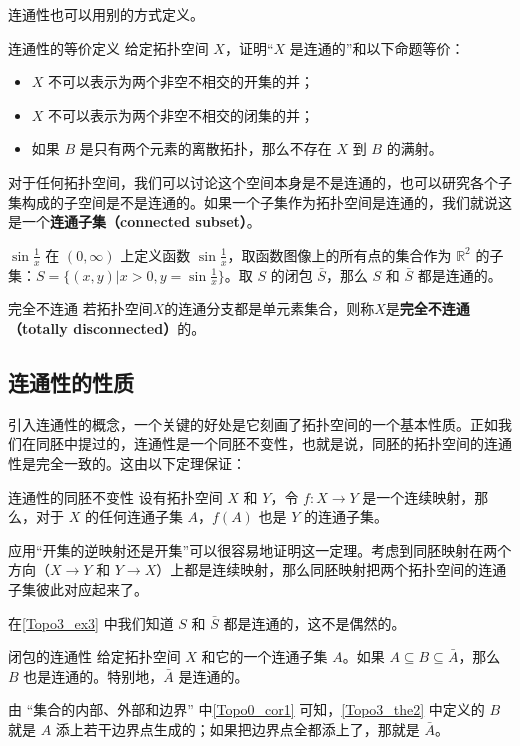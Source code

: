 连通性也可以用别的方式定义。

\begin{exercise}{连通性的等价定义}\label{Topo3_exe1}
给定拓扑空间 $X$，证明“$X$ 是连通的”和以下命题等价：
\begin{itemize}
\item $X$ 不可以表示为两个非空不相交的开集的并；
\item $X$ 不可以表示为两个非空不相交的闭集的并；
\item 如果 $B$ 是只有两个元素的离散拓扑，那么不存在 $X$ 到 $B$ 的满射。

\end{itemize}
\end{exercise}

对于任何拓扑空间，我们可以讨论这个空间本身是不是连通的，也可以研究各个子集构成的子空间是不是连通的。如果一个子集作为拓扑空间是连通的，我们就说这是一个\textbf{连通子集（connected subset）}。

\begin{example}{$\sin{\frac{1}{x}}$}\label{Topo3_ex3}
在 $(0,\infty)$ 上定义函数 $\sin{\frac{1}{x}}$，取函数图像上的所有点的集合作为 $\mathbb{R}^2$ 的子集：$S=\{(x, y)|x>0, y=\sin{\frac{1}{x}}\}$。取 $S$ 的闭包 $\bar{S}$，那么 $S$ 和 $\bar{S}$ 都是连通的。
\end{example}


\begin{definition}{完全不连通}
若拓扑空间$X$的连通分支都是单元素集合，则称$X$是\textbf{完全不连通（totally disconnected）}的。
\end{definition}








\subsection{连通性的性质}

引入连通性的概念，一个关键的好处是它刻画了拓扑空间的一个基本性质。正如我们在同胚中提过的，连通性是一个同胚不变性，也就是说，同胚的拓扑空间的连通性是完全一致的。这由以下定理保证：

\begin{theorem}{连通性的同胚不变性}\label{Topo3_the1}
设有拓扑空间 $X$ 和 $Y$，令 $f:X\rightarrow Y$ 是一个连续映射，那么，对于 $X$ 的任何连通子集 $A$，$f(A)$ 也是 $Y$ 的连通子集。
\end{theorem}

应用“开集的逆映射还是开集”可以很容易地证明这一定理。考虑到同胚映射在两个方向（$X\rightarrow Y$ 和 $Y\rightarrow X$）上都是连续映射，那么同胚映射把两个拓扑空间的连通子集彼此对应起来了。

在\autoref{Topo3_ex3} 中我们知道 $S$ 和 $\bar{S}$ 都是连通的，这不是偶然的。

\begin{theorem}{闭包的连通性}\label{Topo3_the2}
给定拓扑空间 $X$ 和它的一个连通子集 $A$。如果 $A\subseteq B\subseteq\bar{A}$，那么 $B$ 也是连通的。特别地，$\bar{A}$ 是连通的。
\end{theorem}

由 “集合的内部、外部和边界” 中\autoref{Topo0_cor1} 可知，\autoref{Topo3_the2} 中定义的 $B$ 就是 $A$ 添上若干边界点生成的；如果把边界点全都添上了，那就是 $\bar{A}$。